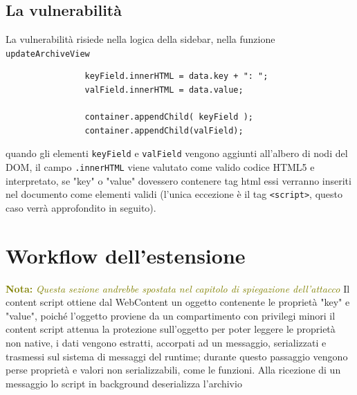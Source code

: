 \documentclass[]{./sapthesis/sapthesis}
\newcommand{\MComment}[3]{\textcolor{#3}{ \textbf{#1} \textit{#2}}}
\newcommand{\Nota}[1]{\MComment{Nota:}{#1}{olive}}
\newcommand{\code}[1]{\texttt{#1}}
\begin{document}
        \subsection{La vulnerabilità}
            La vulnerabilità risiede nella logica della sidebar, nella funzione \code{updateArchiveView}

            \begin{lstlisting}
                keyField.innerHTML = data.key + ": ";
                valField.innerHTML = data.value;
        
                container.appendChild( keyField );
                container.appendChild(valField);
            \end{lstlisting}

            quando gli elementi \code{keyField} e \code{valField} vengono aggiunti all'albero di nodi
            del DOM, il campo \code{.innerHTML} viene valutato come valido codice HTML5 e interpretato,
            se "key" o "value" dovessero contenere tag html essi verranno inseriti nel documento come
            elementi validi (l'unica eccezione è il tag \code{<script>}, questo caso verrà approfondito
            in seguito).

        \section{Workflow dell'estensione}
            \Nota{Questa sezione andrebbe spostata nel capitolo di spiegazione dell'attacco}
            Il content script ottiene dal WebContent un oggetto contenente le proprietà "key" e "value",
            poiché l'oggetto proviene da un compartimento con privilegi minori il content script attenua
            la protezione sull'oggetto per poter leggere le proprietà non native, i dati vengono estratti,
            accorpati ad un messaggio, serializzati e trasmessi sul sistema di messaggi del runtime;
            durante questo passaggio vengono perse proprietà e valori non serializzabili, come le funzioni.
            Alla ricezione di un messaggio lo script in background deserializza l'archivio


\newpage{}
\end{document}
